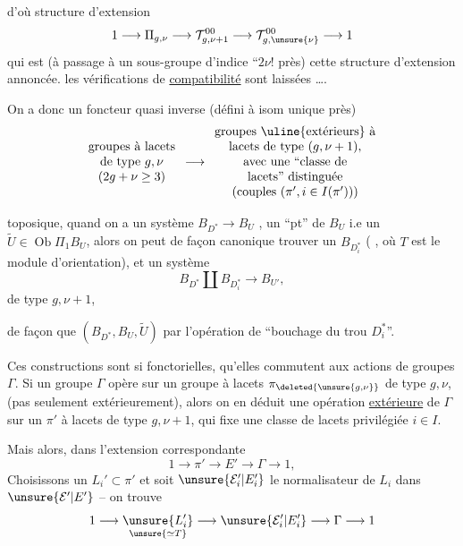 
d'où  structure d'extension 
\[
1\longrightarrow\Pi_{g,\nu}
\longrightarrow\mathcal T^{00}_{g,\nu+1}
\longrightarrow\mathcal T^{00}_{g,\unsure{\nu}}
\longrightarrow1
\]
qui est (à passage à un sous-groupe d'indice ``\(2\nu!\) près) cette structure d'extension annoncée. \unsure{\&} les vérifications de \uline{compatibilité} sont laissées \ldots.

On a donc un foncteur quasi inverse (défini à isom unique près)
\[
\begin{array}{c}
\text{groupes à lacets}\\
\text{de type }g,\nu\\
(2g+\nu\ge3)
\end{array}
\longrightarrow
\begin{array}{c}
\text{groupes \uline{extérieurs} à}\\
\text{lacets de type }(g,\nu+1),\\
\text{avec une ``classe de}\\
\text{lacets'' distinguée}\\
\text{(couples }(\pi',i\in I(\pi'))\text{)}
\end{array}
\]

  toposique, quand on a un système \(B_{D^*}\longrightarrow B_U\) , un ``pt'' de \(B_U\) i.e un \(\widetilde U\in\operatorname{Ob}\Pi_1B_U\), alors on peut de façon canonique trouver un \(B_{D_i^*}\) ( , où \(T\) est le module d'orientation), et un système
\[
B_{D^*}\amalg B_{D_i^*}\longrightarrow B_{U'},
\]
de type \(g,\nu+1\),


de façon que \((B_{D^*},B_U,\widetilde U)\)  par l'opération de ``bouchage du trou \(D_i^*\)''.

Ces constructions sont si fonctorielles, \margin{\unsure{\(\wedge\)}} qu'elles commutent aux actions de groupes \(\Gamma\). Si un groupe \(\Gamma\) opère sur un groupe à lacets \(\pi_{\deleted{\unsure{g,\nu}}}\) de type \(g,\nu\), (pas seulement extérieurement), alors on en déduit une opération \uline{extérieure} de \(\Gamma\) sur un \(\pi'\) à lacets de type \(g,\nu+1\), qui fixe une classe de lacets privilégiée \(i\in I\).

Mais alors, dans l'extension correspondante
\[
1\longrightarrow\pi'\longrightarrow E'\longrightarrow\Gamma\longrightarrow1,
\]
Choisissons un \(L_i'\subset\pi'\) et soit \(\unsure{\mathcal E_i'|E_i'}\) le normalisateur de \(L_i\) dans \(\unsure{\mathcal E'|E'}\) -- on trouve
\[
1\longrightarrow
\underset{\unsure{\simeq T}}{\unsure{L_i'}}
\longrightarrow\unsure{\mathcal E_i'|E_i'}
\longrightarrow\Gamma\longrightarrow1
\]
